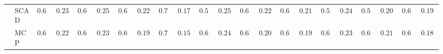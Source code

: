 \begin{tabular}{p{0.2cm}p{1cm}|p{0.6cm}p{0.6cm}|p{0.6cm}p{0.6cm}p{0.6cm}p{0.6cm}p{0.6cm}p{0.6cm}|p{0.6cm}p{0.6cm}p{0.6cm}p{0.6cm}p{0.6cm}p{0.6cm}|p{0.6cm}p{0.6cm}p{0.6cm}p{0.6cm}p{0.6cm}p{0.6cm}}
 & SCAD  & $0.610$ & $0.2385$ & $0.602$ & $0.2535$ & $0.628$ & $0.2292$ & $0.720$ & $0.1798$ & $0.582$ & $0.2576$ & $0.630$ & $0.2209$ & $0.682$ & $0.2185$ & $0.584$ & $0.2489$ & $0.572$ & $0.2089$ & $0.650$ & $0.1936$ \\
 & MCP  & $0.650$ & $0.2263$ & $0.640$ & $0.2327$ & $0.684$ & $0.1973$ & $0.716$ & $0.1587$ & $0.632$ & $0.2441$ & $0.678$ & $0.2008$ & $0.676$ & $0.1985$ & $0.632$ & $0.2339$ & $0.628$ & $0.2128$ & $0.666$ & $0.1821$ \\
\hline 
\end{tabular}

